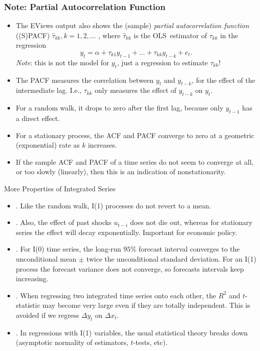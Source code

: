 \begin{frame}
\frametitle{Note: Partial Autocorrelation Function}
\begin{itemize}
\item The EViews output also shows the (sample) \emph{\color{red}partial
autocorrelation function} ((S)PACF) $\hat{\tau}_{kk},k=1,2,\ldots $
, where $\hat{\tau}_{kk}$ is the OLS\ estimator of $%
\tau _{kk}$ in the regression
\begin{equation*}
y_t=\alpha +\tau _{k1}y_{t-1}+\ldots +\tau _{kk}y_{t-k}+e_t.
\end{equation*}
\emph{\color{red}Note}: this is not the model for $y_t$, just a regression
to estimate $\tau _{kk}$!
\item The PACF measures the correlation between $y_t$ and $y_{t-k}$,  for the effect of the intermediate lag. I.e., $\tau _{kk}$ only
measures the  effect of $y_{t-k}$ on $y_t$.
\item For a random walk, it drops to zero after the first lag, because only $y_{t-1}$ has a direct effect.
\item For a stationary process, the ACF and PACF
converge to zero at a geometric (exponential) rate as $k$ increases.
\item
If the sample ACF and PACF of a time series
do not seem to converge at all, or too slowly (linearly), then this is an
indication of nonstationarity.
\end{itemize}
\end{frame}
\begin{frame}{More Properties of Integrated Series}
\begin{itemize}

\item {}. Like the random walk, I(1) processes do not revert to a mean.
\item {}. Also,
the effect of past shocks $u_{t-i}$ does not die out, whereas for stationary
series the effect will decay exponentially. Important for
economic policy.

\item {}. For I(0)
time series, the long-run $95\%$ forecast interval converges to the
unconditional mean $\pm$ twice the unconditional standard
deviation. For an I(1) process the forecast variance does
not converge, so forecasts intervals keep increasing.

\item {}. When regressing two
integrated time series onto each other, the $R^{2}$ and $t$-statistic may become very
large even if they are totally independent. This is avoided if we regress $%
\Delta y_{t}$ on $\Delta x_{t}$.

\item {}. In regressions with I(1) variables, the usual statistical theory breaks down (asymptotic normality of estimators, $t$-tests, etc).
\end{itemize}
\end{frame}





